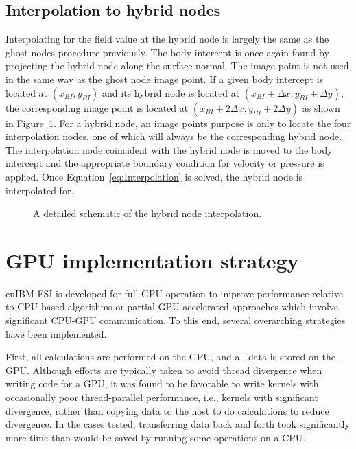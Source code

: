 \subsection{Interpolation to hybrid nodes}
\label{Sec:Interpolation}

Interpolating for the field value at the hybrid node is largely the same as the ghost nodes procedure previously. 
The body intercept is once again found by projecting the hybrid node along the surface normal. 
The image point is not used in the same way as the ghost node image point. 
If a given body intercept is located at $(x_{BI},y_{BI})$ and its hybrid node is located at $(x_{BI}+\Delta x,y_{BI}+\Delta y)$, the corresponding image point is located at $(x_{BI}+2\Delta x,y_{BI}+2\Delta y)$ as shown in Figure~\ref{fig:Interpolate}. 
For a hybrid node, an image points purpose is only to locate the four interpolation nodes, one of which will always be the corresponding hybrid node. 
The interpolation node coincident with the hybrid node is moved to the body intercept and the appropriate boundary condition for velocity or pressure is applied. 
Once Equation~\eqref{eq:Interpolation} is solved, the hybrid node is interpolated for. 

\begin{figure}[!htb]
	\centering
	
	\caption{A detailed schematic of the hybrid node interpolation.}
	\label{fig:Interpolate}
\end{figure}

\section{GPU implementation strategy}
\label{GPU implementation strategy}
cuIBM-FSI is developed for full GPU operation to improve performance relative to CPU-based algorithms or partial GPU-accelerated approaches which involve significant CPU-GPU communication. 
To this end, several overarching strategies have been implemented. 

First, all calculations are performed on the GPU, and all data is stored on the GPU.
Although efforts are typically taken to avoid thread divergence when writing code for a GPU, it was found to be favorable to write kernels with occasionally poor thread-parallel performance, i.e., kernels with significant divergence, rather than copying data to the host to do calculations to reduce divergence. 
In the cases tested, transferring data back and forth took significantly more time than would be saved by running some operations on a CPU. 

